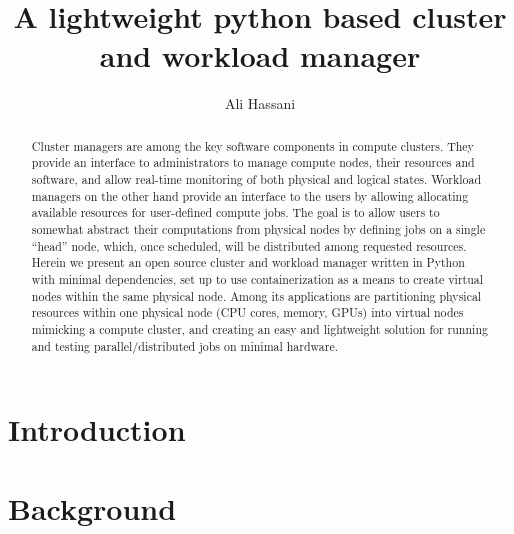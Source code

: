 \documentclass[sigconf]{acmart}
\begin{document}
\title{A lightweight python based cluster and workload manager}


\author{Ali Hassani}

\renewcommand{\shortauthors}{Hassani}

\begin{abstract}
    Cluster managers are among the key software components in compute clusters.
    They provide an interface to administrators to manage compute nodes, their resources and software, and allow real-time
    monitoring of both physical and logical states. Workload managers on the other hand provide an interface to the users by
    allowing allocating available resources for user-defined compute jobs.
    The goal is to allow users to somewhat abstract their computations from physical nodes by defining jobs on a single ``head''
    node, which, once scheduled, will be distributed among requested resources.
    Herein we present an open source cluster and workload manager written in Python with minimal dependencies, set up to use
    containerization as a means to create virtual nodes within the same physical node.
    Among its applications are partitioning physical resources within one physical node (CPU cores, memory, GPUs) into virtual
    nodes mimicking a compute cluster, and creating an easy and lightweight solution for running and testing 
    parallel/distributed jobs on minimal hardware.
\end{abstract}

\maketitle

\section{Introduction}

\section{Background}
\end{document}

